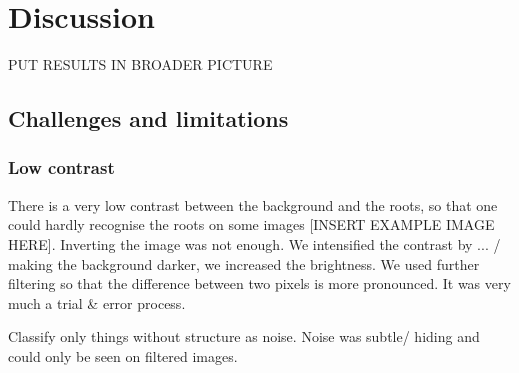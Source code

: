 
\chapter{Discussion} %

\label{discussion} %

%


PUT RESULTS IN BROADER PICTURE


\section{Challenges and limitations}

\subsection{Low contrast}

There is a very low contrast between the background and the roots, so that one could hardly recognise the roots on some images [INSERT EXAMPLE IMAGE HERE].
Inverting the image was not enough. We intensified the contrast by ... / making the background darker, we increased the brightness. We used further filtering so that the difference between two pixels is more pronounced.
It was very much a trial \& error process.

Classify only things without structure as noise. 
Noise was subtle/ hiding and could only be seen on filtered images.

